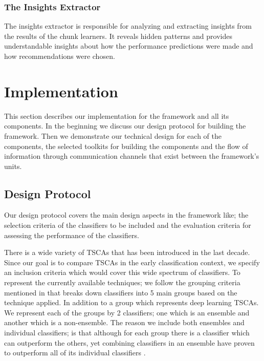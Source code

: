 \subsubsection*{The Insights Extractor}
\label{InsightsExtractor}
The insights extractor is responsible for analyzing and extracting insights from the results of the chunk learners.
It reveals hidden patterns and provides understandable insights about how the performance predictions were made
and how recommendations were chosen.

\section{Implementation}
\label{SectionImplementation}
This section describes our implementation for the framework and all its components.
In the beginning we discuss our design protocol for building the framework.
Then we demonstrate our technical design for each of the components, the selected toolkits for building the components
and the flow of information through communication channels that exist between the framework's units.

\subsection{Design Protocol}
\label{SubsectionProtocol}
Our design protocol covers the main design aspects in the framework like; the selection criteria of the classifiers to be included
and the evaluation criteria for assessing the performance of the classifiers.

There is a wide variety of TSCAs that has been introduced in the last decade.
Since our goal is to compare TSCAs in the early classification context, we specify an inclusion criteria which would cover this wide spectrum of classifiers.
To represent the currently available techniques; we follow the grouping criteria mentioned in \cite{bagnall2017great} that breaks down classifiers into 5 main groups based on the technique applied.
In addition to a  group which represents deep learning TSCAs. We represent each of the groups by 2 classifiers; one which is an ensemble and another which is a non-ensemble.
The reason we include both ensembles and individual classifiers; is that although for each group there is a classifier which can outperform the others,
yet combining classifiers in an ensemble have proven to outperform all of its individual classifiers \cite{fawaz2019deepreview}.

